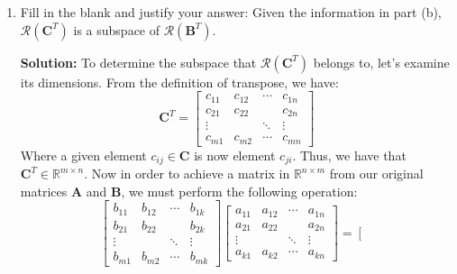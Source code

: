 \documentclass{homework}
\begin{document}
\begin{enumerate}[label=(\alph*)]
	      \par Together, we have shown that $\mathcal{R}(\mathbf{C})$ is a subspace
	      of $\mathcal{R}(\mathbf{A})$. \qed

	\item Fill in the blank and justify your answer: Given the information in
	      part (b), $\mathcal{R}\left( \mathbf{C}^T \right)$ is a subspace of
	      $\mathcal{R}\left(\mathbf{B}^T \right)$.

	      \par \textbf{Solution:}
	      To determine the subspace that $\mathcal{R}\left( \mathbf{C}^T
		      \right)$ belongs to, let's examine its dimensions. From the definition
	      of transpose, we have:
	      $$
		      \mathbf{C}^T  =
		      \left[\begin{array}{cccc}
				      c_{11}  & c_{12}  & \cdots & c_{1 n} \\
				      c_{21}  & c_{22}  &        & c_{2 n} \\
				      \vdots  &         & \ddots & \vdots  \\
				      c_{m 1} & c_{m 2} & \cdots & c_{m n}
			      \end{array}\right]
	      $$
	      Where a given element $c_{ij} \in \mathbf{C}$ is now element $c_{ji}$.
	      Thus, we have that $\mathbf{C}^T \in \mathbb{R}^{m \times n}$. Now in
	      order to achieve a matrix in $\mathbb{R}^{n \times m}$ from our
	      original matrices $\mathbf{A}$ and $\mathbf{B}$, we must perform the
	      following operation:
	      $$
		      \left[\begin{array}{cccc}
				      b_{11}  & b_{12}  & \cdots & b_{1 k} \\
				      b_{21}  & b_{22}  &        & b_{2 k} \\
				      \vdots  &         & \ddots & \vdots  \\
				      b_{m 1} & b_{m 2} & \cdots & b_{m k}
			      \end{array}\right]
		      \left[\begin{array}{cccc}
				      a_{11}  & a_{12} & \cdots & a_{1 n} \\
				      a_{21}  & a_{22} &        & a_{2 n} \\
				      \vdots  &        & \ddots & \vdots  \\
				      a_{k 1} & a_{k2} & \cdots & a_{k n}
			      \end{array}\right]
		      =
		      \left[\begin{array}{cccc}

\end{array}$$
\end{enumerate}
\end{document}
